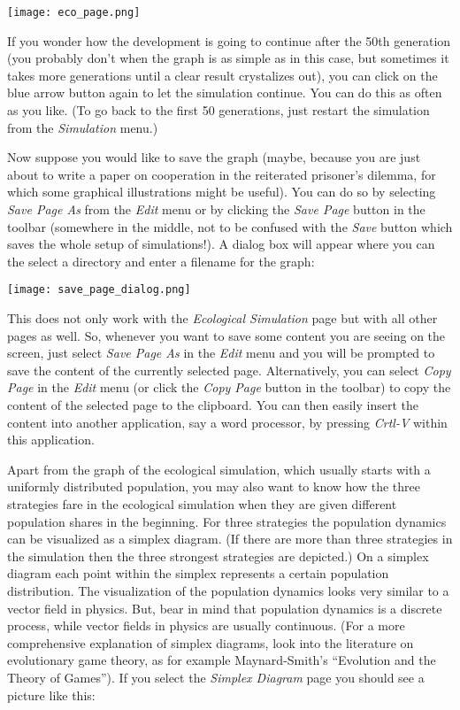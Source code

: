 \documentclass[12pt,a4paper,USenglish]{article}
\begin{document}
\begin{center}\texttt{[image: eco\_page.png]}\end{center}

If you wonder how the development is going to continue after the 50th
generation (you probably don't when the graph is as simple as in this case, but
sometimes it takes more generations until a clear result crystalizes out), you
can click on the blue arrow button again to let the simulation continue. You
can do this as often as you like. (To go back to the first 50 generations,
just restart the simulation from the {\em Simulation} menu.)

Now suppose you would like to save the graph (maybe, because you are
just about to write a paper on cooperation in the reiterated prisoner's
dilemma, for which some graphical illustrations might be useful).
You can do so by selecting \emph{Save Page As} from the \emph{Edit}
menu or by clicking the \emph{Save Page} button in the toolbar (somewhere
in the middle, not to be confused with the \emph{Save} button which
saves the whole setup of simulations!). A dialog box will appear where
you can the select a directory and enter a filename for the graph:

\begin{center}\texttt{[image: save\_page\_dialog.png]}\end{center}

This does not only work with the \emph{Ecological Simulation} page
but with all other pages as well. So, whenever you want to save some
content you are seeing on the screen, just select \emph{Save Page As}
in the \emph{Edit} menu and you will be prompted to save the content
of the currently selected page. Alternatively, you can select \emph{Copy
Page} in the \emph{Edit} menu (or click the \emph{Copy Page} button
in the toolbar) to copy the content of the selected page to the clipboard.
You can then easily insert the content into another application, say
a word processor, by pressing \emph{Crtl-V} within this application.

Apart from the graph of the ecological simulation, which usually starts with a
uniformly distributed population, you may also want to know how the three
strategies fare in the ecological simulation when they are given different
population shares in the beginning.  For three strategies the population
dynamics can be visualized as a simplex diagram. (If there are more than three
strategies in the simulation then the three strongest strategies are depicted.)
On a simplex diagram each point within the simplex represents a certain
population distribution. The visualization of the population dynamics looks
very similar to a vector field in physics. But, bear in mind that population
dynamics is a discrete process, while vector fields in physics are usually
continuous. (For a more comprehensive explanation of simplex diagrams, look
into the literature on evolutionary game theory, as for example
Maynard-Smith's ``Evolution and the Theory of Games''). If you select the
\emph{Simplex Diagram} page you should see a picture like this:
\end{document}
